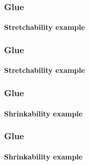 \documentclass{beamer}
\begin{document}
\def\pleasetex#1{
  \draw (0,15) node[right] {``\TeX! Please, make the horizontal list into a box that is {\color{darkred}#1 units wide}''};
  \draw[<->,color=red] (0,-13) -- (#1, -13) node[fill=white,midway] {width #1};
}
   
\begin{frame}
  \frametitle{Glue}
  \framesubtitle{Stretchability example}
\end{frame}



\begin{frame}

  \frametitle{Glue}
  \framesubtitle{Stretchability example}

\end{frame}

\begin{frame}
  \frametitle{Glue}
  \framesubtitle{Shrinkability example}

\end{frame}


\begin{frame}
  \frametitle{Glue}
  \framesubtitle{Shrinkability example}


\end{frame}
\end{document}
